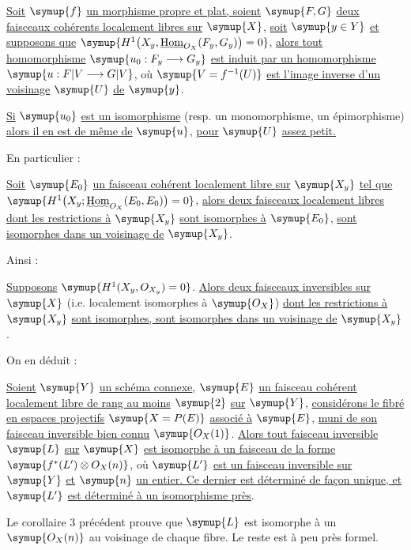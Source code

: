  \uline{Soit} $\symup{f}$ \uline{un morphisme propre et plat, soient} $\symup{F,G}$ \uline{deux
faisceaux cohérents localement libres sur} $\symup{X}$, \uline{soit} $\symup{y\in Y}$ \uline{et supposons que}
$\symup{H^1\bigl(X_y,\Homsh_{O_X}(F_y,G_y)\bigr)=0}$,
\uline{alors tout homomorphisme} $\symup{u_0:F_y\longrightarrow G_y}$ \uline{est induit par un
homomorphisme} $\symup{u:F|V\longrightarrow G|V}$, où $\symup{V=f^{-1}(U)}$ \uline{est l'image inverse d'un voisinage} $\symup{U}$ \uline{de} $\symup{y}$.

 \uline{Si} $\symup{u_0}$ \uline{est un isomorphisme} (resp. un monomorphisme, un
épimorphisme) \uline{alors il en est de même de} $\symup{u}$, \uline{pour} $\symup{U}$ \uline{assez petit.}

En particulier :

 \uline{Soit} $\symup{E_0}$ \uline{un faisceau cohérent localement libre sur}
$\symup{X_y}$ \uline{tel que}
$\symup{H^1\bigl(X_y;\mathop{\text{\uwave{Hom}}}\nolimits_{O_X}(E_0,E_0)\bigr)=0}$,
\uline{alors deux faisceaux localement libres dont les restrictions à} $\symup{X_y}$ \uline{sont
isomorphes à} $\symup{E_0}$, \uline{sont isomorphes dans un voisinage de} $\symup{X_y}$.

Ainsi :

 \uline{Supposons} $\symup{H^1(X_y,O_{X_y})=0}$. \uline{Alors deux faisceaux
inversibles sur} $\symup{X}$ (i.e. localement isomorphes à $\symup{O_X}$) \uline{dont les
restrictions à} $\symup{X_y}$ \uline{sont isomorphes, sont isomorphes dans un voisinage de} $\symup{X_y}$.

On en déduit :

 \uline{Soient} $\symup{Y}$ \uline{un schéma connexe}, $\symup{E}$ \uline{un faisceau cohérent localement libre de rang au moins} $\symup{2}$ \uline{sur} $\symup{Y}$, \uline{considérons le fibré en espaces projectifs}
$\symup{X=P(E)}$ \uline{associé à} $\symup{E}$, \uline{muni de son faisceau inversible bien connu}
$\symup{O_X(1)}$. \uline{Alors tout faisceau inversible} $\symup{L}$ \uline{sur} $\symup{X}$ \uline{est isomorphe à un
faisceau de la forme}
$\symup{f^*(L')\otimes O_X(n)}$,
où $\symup{L'}$ \uline{est un faisceau inversible sur} $\symup{Y}$ \uline{et} $\symup{n}$ \uline{un entier. Ce dernier est
déterminé de façon unique, et} $\symup{L'}$ \uline{est déterminé à un isomorphisme près}.

Le corollaire 3 précédent prouve que $\symup{L}$ est isomorphe à un $\symup{O_X(n)}$ au
voisinage de chaque fibre. Le reste est à peu près formel.

